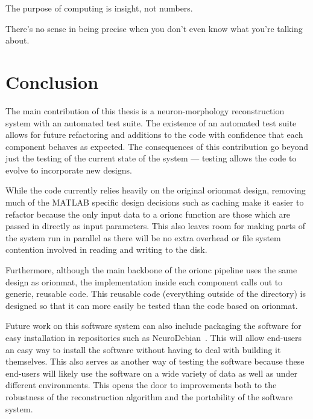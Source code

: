 \begin{savequote}[0.55\linewidth]
	\begin{fancyquote}
		The purpose of computing is insight, not numbers.
	\end{fancyquote}
	\begin{fancyquote}
		There's no sense in being precise when you don't even know what
		you're talking about.
	\end{fancyquote}
\end{savequote}
\chapter{Conclusion}\label{ch:conclusion}

The main contribution of this thesis is a neuron-morphology
reconstruction system with an automated test suite. The existence
of an automated test suite allows for future refactoring and
additions to the code with confidence that each component behaves
as expected. The consequences of this contribution go beyond just
the testing of the current state of the system --- testing allows
the code to evolve to incorporate new designs.

While the code currently relies heavily on the original
\gls{orionmat} design, removing much of the MATLAB specific design
decisions such as caching make it easier to refactor because the
only input data to a \gls{orionc} function are those which are passed in
directly as input parameters. This also leaves room for making
parts of the system run in parallel as there will be no extra
overhead or file system contention involved in reading and writing
to the disk.

Furthermore, although the main backbone of the \gls{orionc}
pipeline uses the same design as \gls{orionmat}, the
implementation inside each component calls out to generic,
reusable code. This reusable code (everything outside of the
 directory) is designed so that it
can more easily be tested than the code based on \gls{orionmat}.

Future work on this software system can also include packaging the
software for easy installation in repositories such as
NeuroDebian~\autocite{NeuroDebian:Halchenko:2012}. This will allow
end-users an easy way to install the software without having to
deal with building it themselves. This also serves as another way
of testing the software because these end-users will likely use
the software on a wide variety of data as well as under different
environments. This opens the door to improvements both to the
robustness of the reconstruction algorithm and the portability of
the software system.
